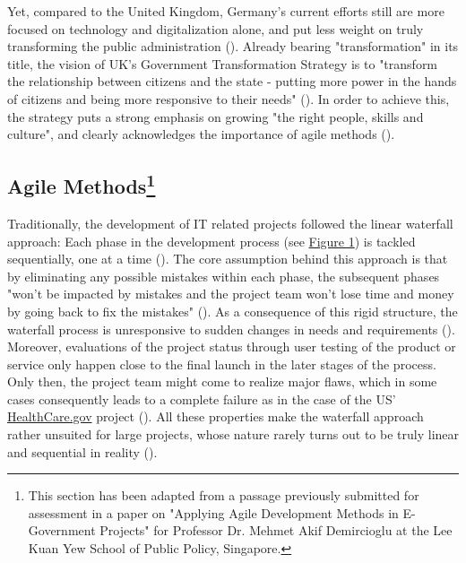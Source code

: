 Yet, compared to the United Kingdom, Germany's current efforts still are more focused on technology and digitalization alone, and put less weight on truly transforming the public administration (\cite{Mergel2019, EuropeanCommission2019b}). Already bearing "transformation" in its title, the vision of UK's Government Transformation Strategy is to "transform the relationship between citizens and the state - putting more power in the hands of citizens and being more responsive to their needs" (\cite{CabinetOffice2017}). In order to achieve this, the strategy puts a strong emphasis on growing "the right people, skills and culture", and clearly acknowledges the importance of agile methods (\cite{CabinetOffice2017}).\par 


\subsection[Agile Methods]{Agile Methods\footnote{This section has been adapted from a passage previously submitted for assessment in a paper on "Applying Agile Development Methods in E-Government Projects" for Professor Dr. Mehmet Akif Demircioglu at the Lee Kuan Yew School of Public Policy, Singapore.}}\label{Agile Methods}
\begin{wrapfigure}[8]{r}{0.5\textwidth}
	\centering
	\texttt{[image: \{"Latex/THESIS/Figures/Waterfall"]}.png}
	\caption[Waterfall development process]{Waterfall development process (adapted from \cite{Mergel2016})}
	\label{fig:Waterfall development}
\end{wrapfigure}
Traditionally, the development of IT related projects followed the linear waterfall approach: Each phase in the development process (see \hyperref[fig:Waterfall development]{Figure 1}) is tackled sequentially, one at a time (\cite{Kannan2014, Sherrell2013}). The core assumption behind this approach is that by eliminating any possible mistakes within each phase, the subsequent phases "won't be impacted by mistakes and the project team won't lose time and money by going back to fix the mistakes" (\cite[p. 517]{Mergel2016}). As a consequence of this rigid structure, the waterfall process is unresponsive to sudden changes in needs and requirements (\cite{Kannan2014}). Moreover, evaluations of the project status through user testing of the product or service only happen close to the final launch in the later stages of the process. Only then, the project team might come to realize major flaws, which in some cases consequently leads to a complete failure as in the case of the US' \href{www.healthcare.gov}{HealthCare.gov} project (\cite{Mergel2016}). All these properties make the waterfall approach rather unsuited for large projects, whose nature rarely turns out to be truly linear and sequential in reality (\cite{Kannan2014}).


